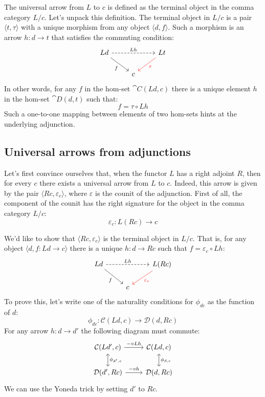 \documentclass[DaoFP]{subfiles}
\begin{document}
The universal arrow from $L$ to $c$ is defined as the terminal object in the comma category $L / c$. Let's unpack this definition. The terminal object in $L/c$ is a pair $\langle t, \tau \rangle$ with a unique morphism from any object $\langle d, f \rangle$. Such a morphism is an arrow $h \colon d \to t$ that satisfies the commuting condition:
\[
 \begin{tikzcd}
 L d
 \arrow[rd, "f"']
 \arrow[rr, dashed, "L h"]
 && L t
 \arrow[ld, red, "\tau"]
 \\
 &c
  \end{tikzcd}
\]
In other words, for any $f$ in the hom-set $\cat C (L d, c)$ there is a unique element $h$ in the hom-set $\cat D (d, t)$ such that:
\[ f = \tau \circ L h \]
Such a one-to-one mapping between elements of two hom-sets hints at the underlying adjunction. 

\subsection{Universal arrows from adjunctions}

Let's first convince ourselves that, when the functor $L$ has a right adjoint $R$, then for every $c$ there exists a universal arrow from $L$ to $c$. Indeed, this arrow is given by the pair $\langle R c, \varepsilon_c \rangle$, where $\varepsilon$ is the counit of the adjunction. First of all, the component of the counit has the right signature for the object in the comma category $L/c$:
\[ \varepsilon_c \colon L (R c) \to c \]

We'd like to show that $\langle R c, \varepsilon_c \rangle$ is the terminal object in $L/c$. That is, for any object $\langle d, f \colon L d \to c \rangle$ there is a unique $h \colon d \to R c$ such that $f = \varepsilon_c \circ L h$:
\[
 \begin{tikzcd}
 L d
 \arrow[rd, "f"']
 \arrow[rr, dashed, "L h"]
 && L (R c)
 \arrow[ld, red, "\varepsilon_c"]
 \\
 &c
  \end{tikzcd}
\]
To prove this, let's write one of the naturality conditions for $\phi_{d c}$ as the function of $d$:
\[  \phi_{d c} \colon \mathcal{C} (L d, c) \to \mathcal{D}( d , R c)\]
For any arrow $h \colon d \to d'$ the following diagram must commute:
\[
 \begin{tikzcd}
 \mathcal{C}(L d', c)
 \arrow[d, leftrightarrow, "\phi_{d', c}"]
 \arrow[r, "- \circ L h"]
 &
 \mathcal{C}(L d, c)
  \arrow[d, leftrightarrow, "\phi_{d, c}"]
 \\
 \mathcal{D}(d', R c)
 \arrow[r, "- \circ h"]
& \mathcal{D}(d, R c)
 \end{tikzcd}
\]
We can use the Yoneda trick by setting $d'$ to $R c$.
\end{document}
